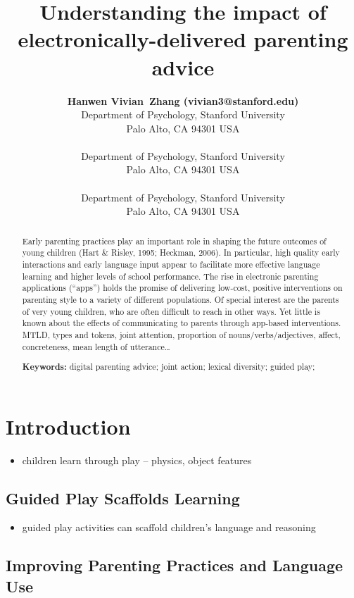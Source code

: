 \documentclass[10pt, letterpaper]{article}
\title{Understanding the impact of electronically-delivered parenting advice}
\author{{\large \bf Hanwen Vivian~Zhang (vivian3@stanford.edu)} \\ Department of Psychology, Stanford University \\ Palo Alto, CA 94301 USA \AND {\large \bf George~Kachergis (george.kachergis@gmail.com)} \\ \\ Department of Psychology, Stanford University \\ Palo Alto, CA 94301 USA \AND {\large \bf Michael C.~Frank (mcfrank@stanford.edu)} \\ \\ Department of Psychology, Stanford University \\ Palo Alto, CA 94301 USA}
\begin{document}
\maketitle

\begin{abstract}
Early parenting practices play an important role in shaping the future
outcomes of young children (Hart \& Risley, 1995; Heckman, 2006). In
particular, high quality early interactions and early language input
appear to facilitate more effective language learning and higher levels
of school performance. The rise in electronic parenting applications
(``apps'') holds the promise of delivering low-cost, positive
interventions on parenting style to a variety of different populations.
Of special interest are the parents of very young children, who are
often difficult to reach in other ways. Yet little is known about the
effects of communicating to parents through app-based interventions.
MTLD, types and tokens, joint attention, proportion of
nouns/verbs/adjectives, affect, concreteness, mean length of
utterance\ldots{}

\textbf{Keywords:}
digital parenting advice; joint action; lexical diversity; guided play;
\end{abstract}

\section{Introduction}\label{introduction}

\begin{itemize}
\tightlist
\item
  children learn through play -- physics, object features
\end{itemize}

\subsection{Guided Play Scaffolds
Learning}\label{guided-play-scaffolds-learning}

\begin{itemize}
\tightlist
\item
  guided play activities can scaffold children's language and reasoning
\end{itemize}

\subsection{Improving Parenting Practices and Language
Use}\label{improving-parenting-practices-and-language-use}
\end{document}
